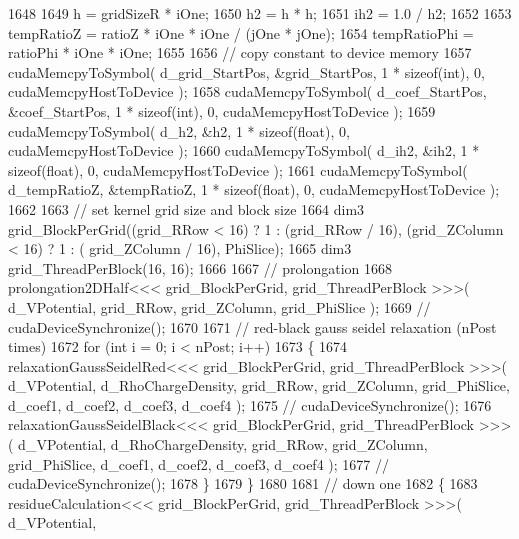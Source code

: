 \begin{DoxyCode}
1648         
1649             h   = gridSizeR * iOne;
1650             h2  = h * h;
1651             ih2 = 1.0 / h2;
1652         
1653             tempRatioZ = ratioZ * iOne * iOne / (jOne * jOne);
1654             tempRatioPhi = ratioPhi * iOne * iOne;
1655     
1656             \textcolor{comment}{// copy constant to device memory}
1657             cudaMemcpyToSymbol( d\_grid\_StartPos, &grid\_StartPos, 1 * \textcolor{keyword}{sizeof}(\textcolor{keywordtype}{int}), 0, cudaMemcpyHostToDevice
       );
1658             cudaMemcpyToSymbol( d\_coef\_StartPos, &coef\_StartPos, 1 * \textcolor{keyword}{sizeof}(\textcolor{keywordtype}{int}), 0, cudaMemcpyHostToDevice
       );
1659             cudaMemcpyToSymbol( d\_h2, &h2, 1 * \textcolor{keyword}{sizeof}(\textcolor{keywordtype}{float}), 0, cudaMemcpyHostToDevice );
1660             cudaMemcpyToSymbol( d\_ih2, &ih2, 1 * \textcolor{keyword}{sizeof}(\textcolor{keywordtype}{float}), 0, cudaMemcpyHostToDevice );
1661             cudaMemcpyToSymbol( d\_tempRatioZ, &tempRatioZ, 1 * \textcolor{keyword}{sizeof}(\textcolor{keywordtype}{float}), 0, cudaMemcpyHostToDevice );
1662 
1663             \textcolor{comment}{// set kernel grid size and block size}
1664             dim3 grid\_BlockPerGrid((grid\_RRow < 16) ? 1 : (grid\_RRow / 16), (grid\_ZColumn < 16) ? 1 : (
      grid\_ZColumn / 16), PhiSlice);
1665             dim3 grid\_ThreadPerBlock(16, 16);
1666     
1667         \textcolor{comment}{// prolongation}
1668             prolongation2DHalf<<< grid\_BlockPerGrid, grid\_ThreadPerBlock >>>( d\_VPotential, grid\_RRow, 
      grid\_ZColumn, grid\_PhiSlice );
1669 \textcolor{comment}{//          cudaDeviceSynchronize();}
1670 
1671             \textcolor{comment}{// red-black gauss seidel relaxation (nPost times)}
1672             \textcolor{keywordflow}{for} (\textcolor{keywordtype}{int} i = 0; i < nPost; i++)
1673             \{
1674                 relaxationGaussSeidelRed<<< grid\_BlockPerGrid, grid\_ThreadPerBlock >>>( d\_VPotential, 
      d\_RhoChargeDensity, grid\_RRow, grid\_ZColumn, grid\_PhiSlice, d\_coef1, d\_coef2, d\_coef3, d\_coef4 );
1675 \textcolor{comment}{//              cudaDeviceSynchronize();}
1676                 relaxationGaussSeidelBlack<<< grid\_BlockPerGrid, grid\_ThreadPerBlock >>>( d\_VPotential, 
      d\_RhoChargeDensity, grid\_RRow, grid\_ZColumn, grid\_PhiSlice, d\_coef1, d\_coef2, d\_coef3, d\_coef4 );
1677 \textcolor{comment}{//              cudaDeviceSynchronize();}
1678             \}
1679         \}
1680 
1681         \textcolor{comment}{// down one}
1682         \{
1683             residueCalculation<<< grid\_BlockPerGrid, grid\_ThreadPerBlock >>>( d\_VPotential, 

\end{DoxyCode}
